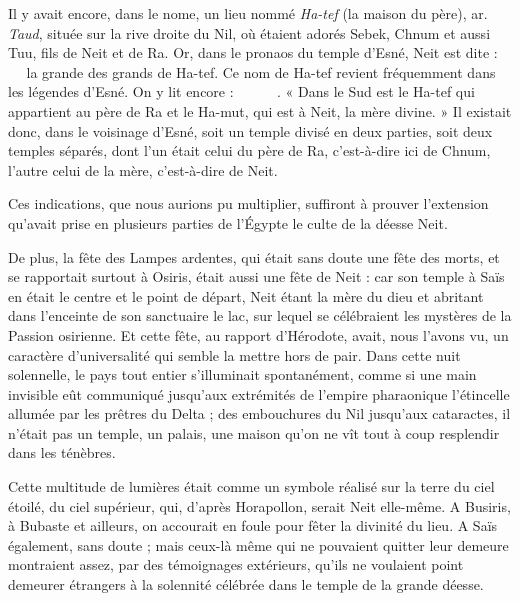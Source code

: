 \documentclass[letterpaper,twocolumn,openany,nodeprecatedcode]{dndbook}
\newcommand*\hieroAAAC{}
\newcommand*\hieroAACN{\raisebox{1ex}{}}
\newcommand*\hieroAACV{}
\newcommand*\hieroAADK{}
\newcommand*\hieroAAEK{}
\newcommand*\hieroAAKO{}
\newcommand*\hieroAAMZ{}
\newcommand*\hieroAAXS{\raisebox{0.5ex}{}}
\newcommand*\hieroAAYP{}
\newcommand*\hieroAAYQ{}
\newcommand*\hieroAAYR{}
\newcommand*\hieroAAYS{}
\newcommand*\hieroAAYT{}
\newcommand*\hieroAAYU{}
\newcommand*\hieroAAYV{}
\newcommand*\hieroAAYW{}
\newcommand*\hieroAAYX{}
\begin{document}
Il y avait encore, dans le nome, un lieu nommé \emph{Ha-tef} (la maison du père), ar. \emph{Taud}, située sur la rive droite du Nil, où étaient adorés Sebek, Chnum et aussi Tuu, fils de Neit et de Ra. Or, dans le pronaos du temple d'Esné, Neit est dite : $\hieroAACV\:\hieroAAMZ\:\hieroAAYP\allowbreak\:\hieroAAXS\:\hieroAAYQ$ la grande des grands de Ha-tef. Ce nom de Ha-tef revient fréquemment dans les légendes d'Esné. On y lit encore : $\hieroAAYR\:\hieroAAYS\:\hieroAAYT\allowbreak\:\hieroAAYU\:\hieroAAYV\:\hieroAADK\allowbreak\:\hieroAAYW\:\hieroAAYX\:\hieroAAAC\allowbreak\:\hieroAACN\:\hieroAACV\allowbreak\:\hieroAAEK\:\hieroAAKO$. « Dans le Sud est le Ha-tef qui appartient au père de Ra et le Ha-mut, qui est à Neit, la mère divine. » Il existait donc, dans le voisinage d'Esné, soit un temple divisé en deux parties, soit deux temples séparés, dont l'un était celui du père de Ra, c'est-à-dire ici de Chnum, l'autre celui de la mère, c'est-à-dire de Neit.

Ces indications, que nous aurions pu multiplier, suffiront à prouver l'extension qu'avait prise en plusieurs parties de l'Égypte le culte de la déesse Neit.

De plus, la fête des Lampes ardentes, qui était sans doute une fête des morts, et se rapportait surtout à Osiris, était aussi une fête de Neit : car son temple à Saïs en était le centre et le point de départ, Neit étant la mère du dieu et abritant dans l'enceinte de son sanctuaire le lac, sur lequel se célébraient les mystères de la Passion osirienne. Et cette fête, au rapport d'Hérodote, avait, nous l'avons vu, un caractère d'universalité qui semble la mettre hors de pair. Dans cette nuit solennelle, le pays tout entier s'illuminait spontanément, comme si une main invisible eût communiqué jusqu'aux extrémités de l'empire pharaonique l'étincelle allumée par les prêtres du Delta ; des embouchures du Nil jusqu'aux cataractes, il n'était pas un temple, un palais, une maison qu'on ne vît tout à coup resplendir dans les ténèbres.

Cette multitude de lumières était comme un symbole réalisé sur la terre du ciel étoilé, du ciel supérieur, qui, d'après Horapollon, serait Neit elle-même. A Busiris, à Bubaste et ailleurs, on accourait en foule pour fêter la divinité du lieu. A Saïs également, sans doute ; mais ceux-là même qui ne pouvaient quitter leur demeure montraient assez, par des témoignages extérieurs, qu'ils ne voulaient point demeurer étrangers à la solennité célébrée dans le temple de la grande déesse.
\end{document}
